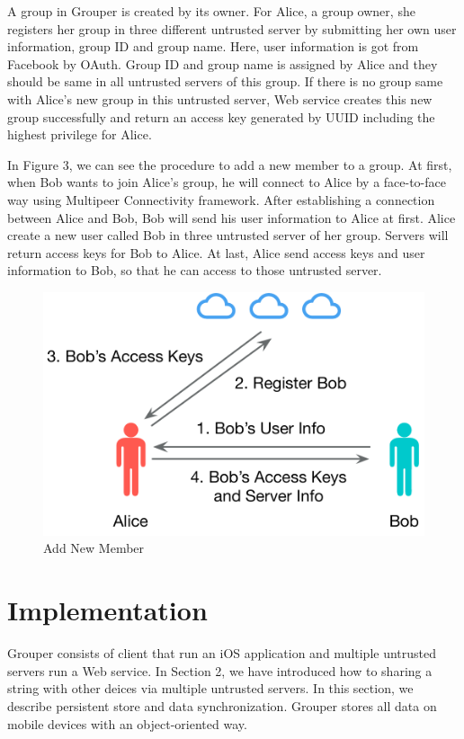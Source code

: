 \documentclass[twocolumn,10pt]{article}
\begin{document}
A group in Grouper is created by its owner. For Alice, a group owner, she registers her group in three different untrusted server by submitting her own user information, group ID and group name. Here, user information is got from Facebook by OAuth. Group ID and group name is assigned by Alice and they should be same in all untrusted servers of this group. If there is no group same with Alice's new group in this untrusted server, Web service creates this new group successfully and return an access key generated by UUID including the highest privilege for Alice.

In Figure 3, we can see the procedure to add a new member to a group. At first, when Bob wants to join Alice's group, he will connect to Alice by a face-to-face way using Multipeer Connectivity framework. After establishing a connection between Alice and Bob, Bob will send his user information to Alice at first. Alice create a new user called Bob in three untrusted server of her group. Servers will return access keys for Bob to Alice. At last, Alice send access keys and user information to Bob, so that he can access to those untrusted server.

\begin{figure}[t]
	\centering
	\includegraphics[scale=0.35]{add_member}
	\caption{Add New Member}
\end{figure}

\section{Implementation}
Grouper consists of client that run an iOS application and multiple untrusted servers run a Web service. In Section 2, we have introduced how to sharing a string with other deices via multiple untrusted servers. In this section, we describe persistent store and data synchronization. Grouper stores all data on mobile devices with an object-oriented way.
\end{document}

